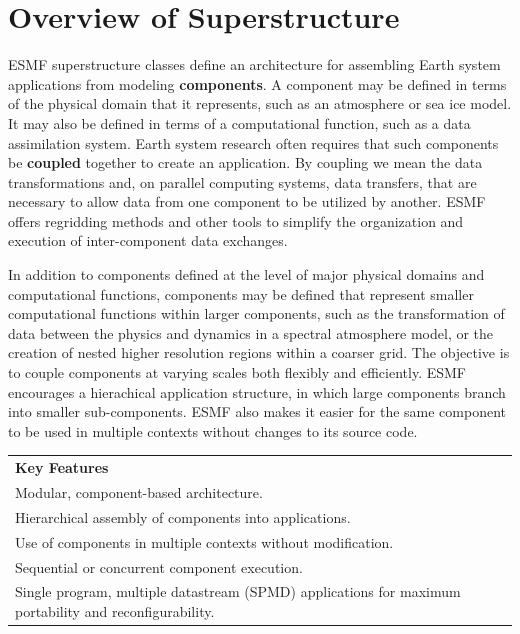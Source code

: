 %

\section{Overview of Superstructure}

ESMF superstructure classes define an architecture for assembling
Earth system applications from modeling {\bf components}.  A component
may be defined in terms of the physical domain that it represents,
such as an atmosphere or sea ice model.  It may also be defined in terms
of a computational function, such as a data assimilation system.
Earth system research often requires that such components be {\bf coupled} 
together to create an application.  By coupling we mean the data 
transformations and, on parallel computing systems, data transfers, 
that are necessary to allow data from one component to be utilized by 
another.  ESMF offers regridding methods and other tools to simplify 
the organization and execution of inter-component data exchanges.  

In addition to components defined at the level of major physical 
domains and computational functions, components may be defined that 
represent smaller computational functions within larger components, 
such as the transformation of data between the physics and dynamics 
in a spectral atmosphere model, 
or the creation of nested higher resolution regions 
within a coarser grid.  The objective is to couple components at varying 
scales both flexibly and efficiently.  ESMF encourages a hierachical
application structure, in which large components branch into 
smaller sub-components.  ESMF also makes it easier for the same 
component to be used in multiple contexts without changes to its 
source code.

\begin{center}  
\begin{tabular}{|p{6in}|}
\hline
\vspace{.01in}
{\bf Key Features} \\[.01in]
Modular, component-based architecture. \\
Hierarchical assembly of components into applications.\\
Use of components in multiple contexts without modification.\\
Sequential or concurrent component execution.\\
Single program, multiple datastream (SPMD) applications for 
maximum portability and reconfigurability.\\[.03in] \hline
\end{tabular}
\end{center}

